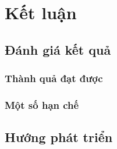 \chapter{Kết luận}\label{chap:conclude}
    \section{Đánh giá kết quả}
    	\subsection{Thành quả đạt được}
    
        \subsection{Một số hạn chế}
    \section{Hướng phát triển}